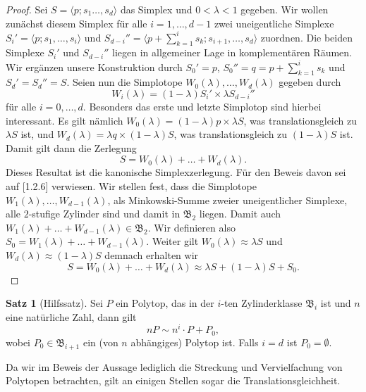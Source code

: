 \documentclass[11pt,titlepage]{article}
\theoremstyle{definition}
\newtheorem{theorem}{Satz}[section]
\theoremstyle{remark}
\begin{document}
	\begin{proof}
		Sei $S=\langle p;s_1\ldots,s_d\rangle$ das Simplex und 
		$0<\lambda<1$ gegeben. Wir wollen 
		zunächst diesem Simplex für alle $i=1,\ldots,d-1$ zwei 
		uneigentliche Simplexe $S_i'=\langle p;s_1,\ldots,s_i\rangle$ und 
		$S_{d-i}''=\langle p+\sum_{k=1}^i s_k ;s_{i+1},\ldots,s_d\rangle$ 
		zuordnen. Die beiden Simplexe $S_i'$ und $S_{d-i}''$ liegen 
		in allgemeiner Lage in komplementären Räumen. Wir ergänzen 
		unsere Konstruktion durch $S_0'=p$, $S_0''=q=p+\sum_{k=1}^i s_k$ und 
		$S_d'=S_d''=S$. Seien nun die Simplotope 
		$W_0(\lambda),\ldots,W_d(\lambda)$ gegeben durch
		\[W_i(\lambda)=(1-\lambda)S_i' \times \lambda S_{d-i}''\]
		für alle $i=0,\ldots,d$. Besonders das erste und letzte Simplotop 
		sind hierbei interessant. Es gilt nämlich 
		$W_0(\lambda)=(1-\lambda)p\times \lambda S$, was translationsgleich 
		zu $\lambda S$ ist, und $W_d(\lambda)=\lambda q\times (1-\lambda) S$, 
		was translationsgleich zu $(1-\lambda)S$ ist. Damit gilt dann 
		die Zerlegung
		\[S=W_0(\lambda)+\ldots+W_d(\lambda).\]
		Dieses Resultat ist die kanonische Simplexzerlegung. Für den Beweis 
		davon sei auf \cite{Hadwiger}[1.2.6] verwiesen. 
		Wir stellen fest, dass die Simplotope $W_1(\lambda),\ldots,W_{d-1}(\lambda)$, als 
		Minkowski-Summe zweier uneigentlicher Simplexe, alle $2$-stufige Zylinder 
		sind und damit in $\mathfrak{B}_2$ liegen. Damit auch 
		$W_1(\lambda)+\ldots+W_{d-1}(\lambda)\in\mathfrak{B}_2$. Wir 
		definieren also $S_0=W_1(\lambda)+\ldots+W_{d-1}(\lambda)$. 
		Weiter gilt $W_0(\lambda)\approx \lambda S$ und 
		$W_d(\lambda)\approx (1-\lambda)S$ demnach erhalten wir
		\[S=W_0(\lambda)+\ldots+W_d(\lambda)\approx \lambda S+(1-\lambda)S+S_0.\]
	\end{proof}
	
	\begin{theorem}[Hilfssatz]\label{thm:hilfssatz}
		Sei $P$ ein Polytop, das in der $i$-ten Zylinderklasse $\mathfrak{B}_i$ ist 
		und $n$ eine natürliche Zahl, dann gilt
		\[nP\sim n^i\cdot P+P_0,\]
		wobei $P_0\in\mathfrak{B}_{i+1}$ ein (von $n$ abhängiges) Polytop ist. 
		Falls $i=d$ ist $P_0=\emptyset$.
	\end{theorem}
	
	Da wir im 
	Beweis der Aussage lediglich die Streckung und Vervielfachung von Polytopen 
	betrachten, gilt an einigen Stellen sogar die Translationsgleichheit.
	
\end{document}
